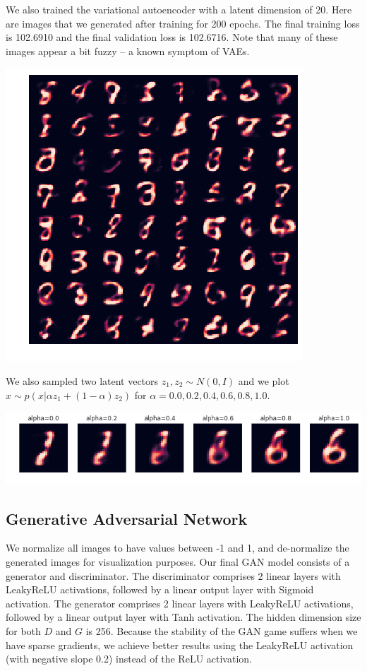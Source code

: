 \documentclass[11pt]{article}
\begin{document}
We also trained the variational autoencoder with a latent dimension of 20.  Here are images that we generated after training for 200 epochs.  The final training loss is 102.6910 and the final validation loss is 102.6716.  Note that many of these images appear a bit fuzzy -- a known symptom of VAEs. 
 \begin{center}
\includegraphics[scale=0.5]{vae3.png}
\end{center} 

We also sampled two latent vectors $z_1, z_2 \sim N(0, I)$ and we plot $x \sim p(x \vert \alpha z_1 + (1 - \alpha) z_2)$ for $\alpha = 0.0, 0.2, 0.4, 0.6, 0.8, 1.0$.
 \begin{center}
\includegraphics[scale=0.7]{vae4.png}
\end{center} 

\subsection{Generative Adversarial Network} 
We normalize all images to have values between -1 and 1, and de-normalize the generated images for visualization purposes. Our final GAN model consists of a generator and discriminator. The discriminator comprises 2 linear layers with LeakyReLU activations, followed by a linear output layer with Sigmoid activation. The generator comprises 2 linear layers with LeakyReLU activations, followed by a linear output layer with Tanh activation. The hidden dimension size for both $D$ and $G$ is 256. Because the stability of the GAN game suffers when we have sparse gradients, we achieve better results using the LeakyReLU activation (with negative slope 0.2) instead of the ReLU activation.
\end{document}
